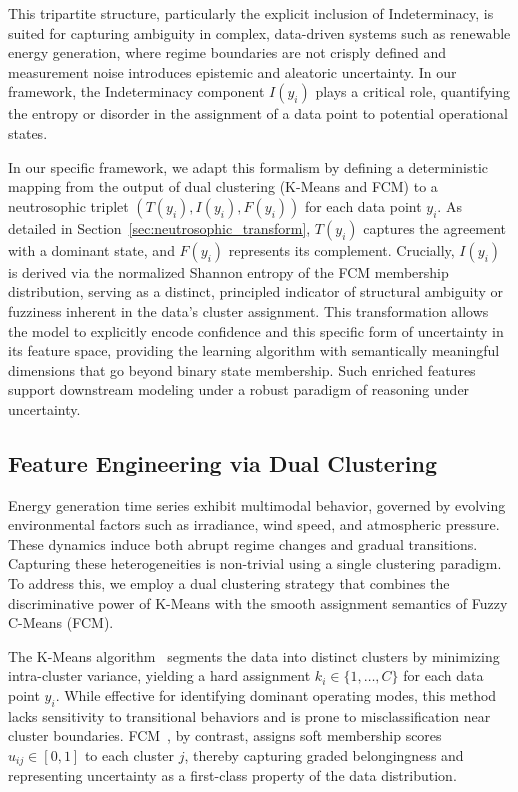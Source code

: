 \documentclass[review,3p,times]{elsarticle}
\begin{document}
This tripartite structure, particularly the explicit inclusion of Indeterminacy, is suited for capturing ambiguity in complex, data-driven systems such as renewable energy generation, where regime boundaries are not crisply defined and measurement noise introduces epistemic and aleatoric uncertainty. In our framework, the Indeterminacy component $I(y_i)$ plays a critical role, quantifying the entropy or disorder in the assignment of a data point to potential operational states.

In our specific framework, we adapt this formalism by defining a deterministic mapping from the output of dual clustering (K-Means and FCM) to a neutrosophic triplet $(T(y_i), I(y_i), F(y_i))$ for each data point $y_i$. As detailed in Section~\ref{sec:neutrosophic_transform}, $T(y_i)$ captures the agreement with a dominant state, and $F(y_i)$ represents its complement. Crucially, $I(y_i)$ is derived via the normalized Shannon entropy of the FCM membership distribution, serving as a distinct, principled indicator of structural ambiguity or fuzziness inherent in the data's cluster assignment. This transformation allows the model to explicitly encode confidence and this specific form of uncertainty in its feature space, providing the learning algorithm with semantically meaningful dimensions that go beyond binary state membership. Such enriched features support downstream modeling under a robust paradigm of reasoning under uncertainty.

\subsection{Feature Engineering via Dual Clustering}

Energy generation time series exhibit multimodal behavior, governed by evolving environmental factors such as irradiance, wind speed, and atmospheric pressure. These dynamics induce both abrupt regime changes and gradual transitions. Capturing these heterogeneities is non-trivial using a single clustering paradigm. To address this, we employ a dual clustering strategy that combines the discriminative power of K-Means with the smooth assignment semantics of Fuzzy C-Means (FCM).

The K-Means algorithm~\cite{macqueen1967some} segments the data into distinct clusters by minimizing intra-cluster variance, yielding a hard assignment $k_i \in \{1, \ldots, C\}$ for each data point $y_i$. While effective for identifying dominant operating modes, this method lacks sensitivity to transitional behaviors and is prone to misclassification near cluster boundaries. FCM~\cite{bezdek1984fcm}, by contrast, assigns soft membership scores $u_{ij} \in [0,1]$ to each cluster $j$, thereby capturing graded belongingness and representing uncertainty as a first-class property of the data distribution.
\end{document}
